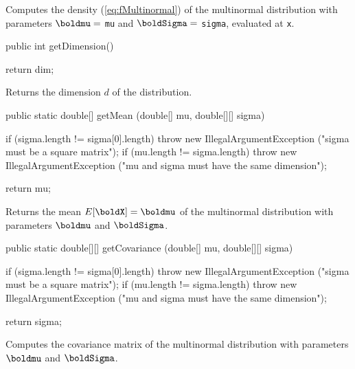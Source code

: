 \begin{tabb}
   Computes the density (\ref{eq:fMultinormal}) of the multinormal distribution
   with parameters $\boldmu =$ \texttt{mu}  and $\boldSigma =$ \texttt{sigma},
  evaluated at \texttt{x}.
\end{tabb}
\begin{code}

   public int getDimension()\begin{hide} {
      return dim;
   }\end{hide}
\end{code}
\begin{tabb}
   Returns the dimension $d$ of the distribution.
\end{tabb}
\begin{code}

   public static double[] getMean (double[] mu, double[][] sigma)\begin{hide} {
      if (sigma.length != sigma[0].length)
         throw new IllegalArgumentException ("sigma must be a square matrix");
      if (mu.length != sigma.length)
         throw new IllegalArgumentException ("mu and sigma must have the same dimension");

      return mu;
   }\end{hide}
\end{code}
\begin{tabb}
   Returns the mean $E[\boldX] = \boldmu$ of the multinormal distribution
   with parameters $\boldmu$ and $\boldSigma$.
\end{tabb}
\begin{code}

   public static double[][] getCovariance (double[] mu, double[][] sigma)\begin{hide} {
      if (sigma.length != sigma[0].length)
         throw new IllegalArgumentException ("sigma must be a square matrix");
      if (mu.length != sigma.length)
         throw new IllegalArgumentException ("mu and sigma must have the same dimension");

      return sigma;
   }\end{hide}
\end{code}
\begin{tabb}
   Computes the covariance matrix of the multinormal distribution
   with parameters $\boldmu$ and $\boldSigma$.
\end{tabb}
